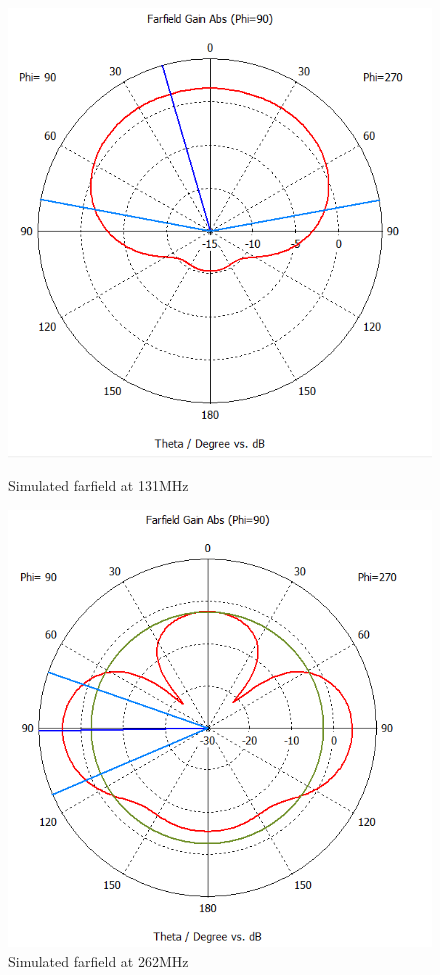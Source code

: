 \begin{figure}[H]
  \centering
  \begin{minipage}[b]{0.5\textwidth}
	\includegraphics[scale = 0.4]{figures/antennas/qha/qha_6_ff_131}
	\caption{Simulated farfield at 131MHz}	
    \label{fig:QHA_ff_131}
  \end{minipage}
  \hfill
  \begin{minipage}[b]{0.4\textwidth}
	\includegraphics[scale = 0.4]{figures/antennas/qha/qha_6_ff_262}
	\caption{Simulated farfield at 262MHz}
    \label{fig:QHA_ff_262}
  \end{minipage}
\end{figure}


